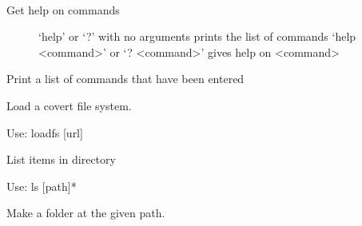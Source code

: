 \documentclass[letterpaper,10pt,english]{sphinxmanual}
\begin{document}
\begin{fulllineitems}
\begin{fulllineitems}
\end{fulllineitems}


\begin{fulllineitems}
\label{main:main.Console.do_help}~\begin{description}
\item[{Get help on commands}] \leavevmode
`help' or `?' with no arguments prints the list of commands
`help \textless{}command\textgreater{}' or `? \textless{}command\textgreater{}' gives help on \textless{}command\textgreater{}

\end{description}

\end{fulllineitems}


\begin{fulllineitems}
\label{main:main.Console.do_hist}
Print a list of commands that have been entered

\end{fulllineitems}


\begin{fulllineitems}
\label{main:main.Console.do_loadfs}
Load a covert file system.

Use: loadfs {[}url{]}

\end{fulllineitems}


\begin{fulllineitems}
\label{main:main.Console.do_ls}
List items in directory

Use: ls {[}path{]}*

\end{fulllineitems}


\begin{fulllineitems}
\label{main:main.Console.do_mkdir}
Make a folder at the given path.


\end{fulllineitems}
\end{fulllineitems}
\end{document}
